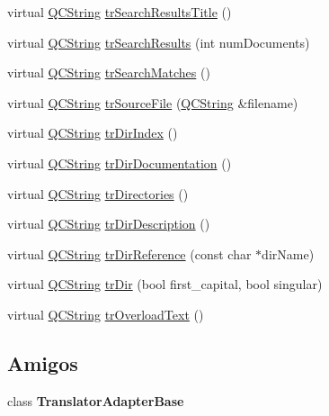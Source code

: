 \begin{DoxyCompactItemize}
virtual \hyperlink{class_q_c_string}{Q\-C\-String} \hyperlink{class_translator_slovene_a711c6a2b5461f1f055d00611ea3a0533}{tr\-Search\-Results\-Title} ()
\item 
virtual \hyperlink{class_q_c_string}{Q\-C\-String} \hyperlink{class_translator_slovene_ae43fbd8a6b08b331a6586422bd8c465e}{tr\-Search\-Results} (int num\-Documents)
\item 
virtual \hyperlink{class_q_c_string}{Q\-C\-String} \hyperlink{class_translator_slovene_a0677855fd52afcda6d47b2cc51e7de31}{tr\-Search\-Matches} ()
\item 
virtual \hyperlink{class_q_c_string}{Q\-C\-String} \hyperlink{class_translator_slovene_a1b3571c6c75d16ebe3763f510bd95b68}{tr\-Source\-File} (\hyperlink{class_q_c_string}{Q\-C\-String} \&filename)
\item 
virtual \hyperlink{class_q_c_string}{Q\-C\-String} \hyperlink{class_translator_slovene_ae9895001e5d8629fd068895b2ffa653f}{tr\-Dir\-Index} ()
\item 
virtual \hyperlink{class_q_c_string}{Q\-C\-String} \hyperlink{class_translator_slovene_a89a223d69d1255271719c256b2fd451b}{tr\-Dir\-Documentation} ()
\item 
virtual \hyperlink{class_q_c_string}{Q\-C\-String} \hyperlink{class_translator_slovene_ab7610b46aedb923a1524272dfbaeab38}{tr\-Directories} ()
\item 
virtual \hyperlink{class_q_c_string}{Q\-C\-String} \hyperlink{class_translator_slovene_abf769d2a217fcf6b9d3b9170fbbae7c8}{tr\-Dir\-Description} ()
\item 
virtual \hyperlink{class_q_c_string}{Q\-C\-String} \hyperlink{class_translator_slovene_ae680136bec0ce1d29a1e4e00d871797f}{tr\-Dir\-Reference} (const char $\ast$dir\-Name)
\item 
virtual \hyperlink{class_q_c_string}{Q\-C\-String} \hyperlink{class_translator_slovene_abb2b35bd374b96530198bf061054c951}{tr\-Dir} (bool first\-\_\-capital, bool singular)
\item 
virtual \hyperlink{class_q_c_string}{Q\-C\-String} \hyperlink{class_translator_slovene_ac5436cb286c48cd540d0cdce200a82b9}{tr\-Overload\-Text} ()
\end{DoxyCompactItemize}
\subsection*{Amigos}
\begin{DoxyCompactItemize}
\item 
\hypertarget{class_translator_slovene_a6a27329ec4f8a11907f075e9052d96f7}{class {\bfseries Translator\-Adapter\-Base}}\label{class_translator_slovene_a6a27329ec4f8a11907f075e9052d96f7}

\end{DoxyCompactItemize}
